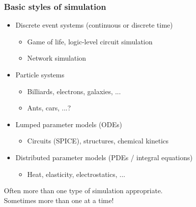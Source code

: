 \documentclass{beamer}
\begin{document}
\begin{frame}
  \titlepage
\end{frame}


\begin{frame}
  \frametitle{Basic styles of simulation}

  \begin{itemize}
  \item Discrete event systems (continuous or discrete time)
    \begin{itemize}
    \item Game of life, logic-level circuit simulation
    \item Network simulation
    \end{itemize}
  \item Particle systems
    \begin{itemize}
    \item Billiards, electrons, galaxies, ...
    \item Ants, cars, ...?
    \end{itemize}
  \item Lumped parameter models (ODEs)
    \begin{itemize}
    \item Circuits (SPICE), structures, chemical kinetics
    \end{itemize}
  \item Distributed parameter models (PDEs / integral equations)
    \begin{itemize}
    \item Heat, elasticity, electrostatics, ...
    \end{itemize}
  \end{itemize}
  Often more than one type of simulation appropriate. \\
  Sometimes more than one at a time!

\end{frame}
\end{document}
